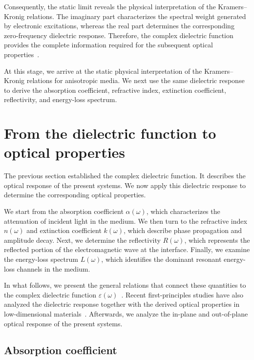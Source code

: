 Consequently, the static limit reveals the physical interpretation of the Kramers--Kronig relations.
The imaginary part characterizes the spectral weight generated by electronic excitations, 
whereas the real part determines the corresponding zero-frequency dielectric response.
Therefore, the complex dielectric function provides the complete information required for the subsequent optical properties~\cite{lucarini2005kramers,vandenberghe2023two}.

At this stage, we arrive at the static physical interpretation of the Kramers--Kronig relations for anisotropic media.
We next use the same dielectric response to derive the absorption coefficient, refractive index, extinction coefficient, reflectivity, and energy-loss spectrum.

\newpage
\section{From the dielectric function to optical properties}
\label{sec:from_dielectric_function_to_optical_properties}

The previous section established the complex dielectric function.
It describes the optical response of the present systems.
We now apply this dielectric response to determine the
corresponding optical properties.

We start from the absorption coefficient $\alpha(\omega)$,
which characterizes the attenuation of incident light in the
medium.
We then turn to the refractive index $n(\omega)$ and extinction
coefficient $k(\omega)$, which describe phase propagation and
amplitude decay.
Next, we determine the reflectivity $R(\omega)$, which
represents the reflected portion of the electromagnetic wave at
the interface.
Finally, we examine the energy-loss spectrum $L(\omega)$,
which identifies the dominant resonant energy-loss channels in the medium.

In what follows, we present the general relations that
connect these quantities to the complex dielectric function $\varepsilon(\omega)$~\cite{born2013principles,wooten2013optical,dressel2002electrodynamics,fox2010optical}.
Recent first-principles studies have also analyzed the dielectric response together with the derived optical properties in low-dimensional materials~\cite{niu2024electronic,khan2025insight,albert2024optical,huang2023optical,cheng2025two}.
Afterwards, we analyze the in-plane and out-of-plane optical response of the present systems.

\subsection{Absorption coefficient}

